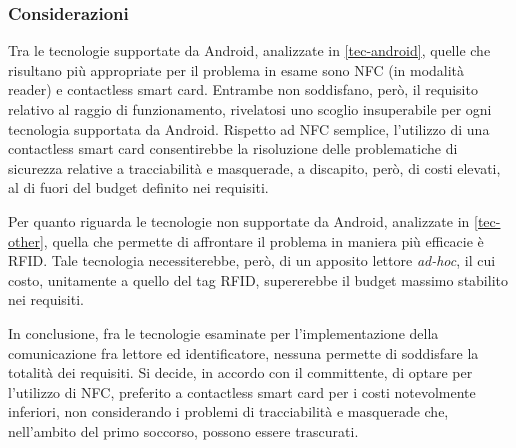 \documentclass[a4paper,12pt]{report}
\begin{document}
\subsubsection{Considerazioni}
Tra le tecnologie supportate da Android, analizzate in \autoref{tec-android}, quelle che risultano più appropriate per il problema in esame sono NFC (in modalità reader) e contactless smart card. Entrambe non soddisfano, però, il requisito relativo al raggio di funzionamento, rivelatosi uno scoglio insuperabile per ogni tecnologia supportata da Android. Rispetto ad NFC semplice, l'utilizzo di una contactless smart card consentirebbe la risoluzione delle problematiche di sicurezza relative a tracciabilità e masquerade, a discapito, però, di costi elevati, al di fuori del budget definito nei requisiti. 

Per quanto riguarda le tecnologie non supportate da Android, analizzate in \autoref{tec-other}, quella che permette di affrontare il problema in maniera più efficacie è RFID. Tale tecnologia necessiterebbe, però, di un apposito lettore \emph{ad-hoc}, il cui costo, unitamente a quello del tag RFID, supererebbe il budget massimo stabilito nei requisiti.

In conclusione, fra le tecnologie esaminate per l'implementazione della comunicazione fra lettore ed identificatore, nessuna permette di soddisfare la totalità dei requisiti. Si decide, in accordo con il committente, di optare per l'utilizzo di NFC, preferito a contactless smart card per i costi notevolmente inferiori, non considerando i problemi di tracciabilità e masquerade che, nell'ambito del primo soccorso, possono essere trascurati.
\end{document}
